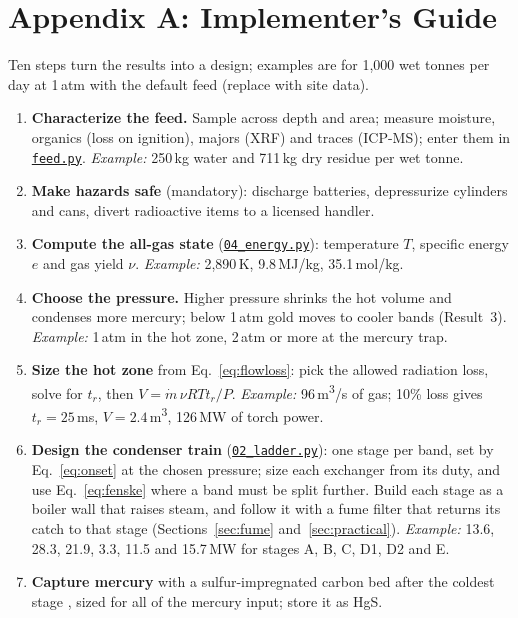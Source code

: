 \documentclass[11pt,a4paper]{article}
\newcommand{\gh}[2]{\href{https://github.com/syncaissa/paramanu-reclaimer/blob/main/#1}{\texttt{#2}}}
\theoremstyle{definition}
\theoremstyle{plain}
\theoremstyle{remark}
\begin{document}
\section*{Appendix A: Implementer's Guide}\label{sec:guide}
{\small Ten steps turn the results into a design; examples are for 1,000 wet tonnes per day at 1\,atm with the default feed (replace with site data).
\begin{enumerate}[label=\textbf{A.\arabic*},leftmargin=2.6em,itemsep=2pt]
\item \textbf{Characterize the feed.} Sample across depth and area; measure moisture, organics (loss on ignition), majors (XRF) and traces (ICP-MS); enter them in \gh{simulation/paramanu_sim/feed.py}{feed.py}. \emph{Example:} 250\,kg water and 711\,kg dry residue per wet tonne.
\item \textbf{Make hazards safe} (mandatory): discharge batteries, depressurize cylinders and cans, divert radioactive items to a licensed handler.
\item \textbf{Compute the all-gas state} (\gh{simulation/scripts/04_energy.py}{04\_energy.py}): temperature $T$, specific energy $e$ and gas yield $\nu$. \emph{Example:} 2,890\,K, 9.8\,MJ/kg, 35.1\,mol/kg.
\item \textbf{Choose the pressure.} Higher pressure shrinks the hot volume and condenses more mercury; below 1\,atm gold moves to cooler bands (Result~3). \emph{Example:} 1\,atm in the hot zone, 2\,atm or more at the mercury trap.
\item \textbf{Size the hot zone} from Eq.~\ref{eq:flowloss}: pick the allowed radiation loss, solve for $t_r$, then $V = \dot m\,\nu RT t_r/P$. \emph{Example:} 96\,m\textsuperscript{3}/s of gas; 10\% loss gives $t_r = 25$\,ms, $V = 2.4$\,m\textsuperscript{3}, 126\,MW of torch power.
\item \textbf{Design the condenser train} (\gh{simulation/scripts/02_ladder.py}{02\_ladder.py}): one stage per band, set by Eq.~\ref{eq:onset} at the chosen pressure; size each exchanger from its duty, and use Eq.~\ref{eq:fenske} where a band must be split further. Build each stage as a boiler wall that raises steam, and follow it with a fume filter that returns its catch to that stage (Sections~\ref{sec:fume} and~\ref{sec:practical}). \emph{Example:} 13.6, 28.3, 21.9, 3.3, 11.5 and 15.7\,MW for stages A, B, C, D1, D2 and E.
\item \textbf{Capture mercury} with a sulfur-impregnated carbon bed after the coldest stage \citep{korpiel1997}, sized for all of the mercury input; store it as HgS.

\end{enumerate}}
\end{document}

